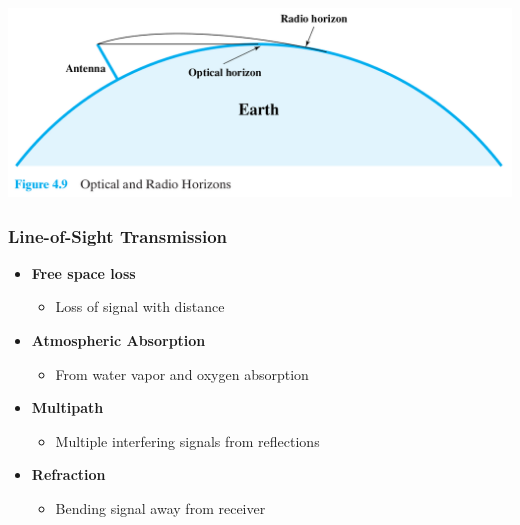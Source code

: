 \documentclass[pdflatex,compress]{beamer}
\begin{document}
\begin{frame}
	\begin{center}
		\includegraphics[width=\linewidth]{img/img26}
	\end{center}
\end{frame}

\begin{frame}
	\frametitle{Line-of-Sight Transmission}
	\begin{itemize}
		\item \textbf{Free space loss}
		\begin{itemize}
			\item Loss of signal with distance
		\end{itemize}
		\item \textbf{Atmospheric Absorption}
		\begin{itemize}
			\item From water vapor and oxygen absorption
		\end{itemize}
		\item \textbf{Multipath}
		\begin{itemize}
			\item Multiple interfering signals from reflections
		\end{itemize}
		\item \textbf{Refraction}
		\begin{itemize}
			\item Bending signal away from receiver
		\end{itemize}
	\end{itemize}
\end{frame}
\end{document}
